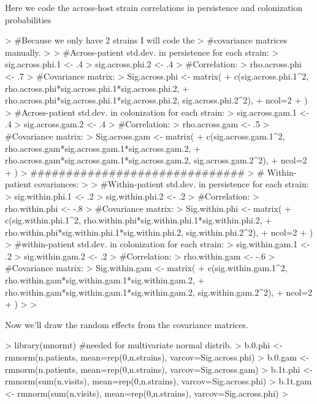 \documentclass{article}
\begin{document}
Here we code the across-host strain correlations in persistence and colonization probabilities
\begin{Schunk}
\begin{Sinput}
> #Because we only have 2 strains I will code the
> #covariance matrices manually.
> 
> #Across-patient std.dev. in persistence for each strain:
> sig.across.phi.1 <- .4
> sig.across.phi.2 <- .4
> #Correlation:
> rho.across.phi <- .7
> #Covariance matrix:
> Sig.across.phi <- matrix(
+   c(sig.across.phi.1^2, rho.across.phi*sig.across.phi.1*sig.across.phi.2,
+     rho.across.phi*sig.across.phi.1*sig.across.phi.2, sig.across.phi.2^2),
+   ncol=2
+   )
> #Across-patient std.dev. in colonization for each strain:
> sig.across.gam.1 <- .4
> sig.across.gam.2 <- .4
> #Correlation:
> rho.across.gam <- .5
> #Covariance matrix:
> Sig.across.gam <- matrix(
+   c(sig.across.gam.1^2, rho.across.gam*sig.across.gam.1*sig.across.gam.2,
+     rho.across.gam*sig.across.gam.1*sig.across.gam.2, sig.across.gam.2^2),
+   ncol=2
+   )
> ##############################
> # Within-patient covariances:
> 
> #Within-patient std.dev. in persistence for each strain:
> sig.within.phi.1 <- .2
> sig.within.phi.2 <- .2
> #Correlation:
> rho.within.phi <- -.8
> #Covariance matrix:
> Sig.within.phi <- matrix(
+   c(sig.within.phi.1^2, rho.within.phi*sig.within.phi.1*sig.within.phi.2,
+     rho.within.phi*sig.within.phi.1*sig.within.phi.2, sig.within.phi.2^2),
+   ncol=2
+   )
> #within-patient std.dev. in colonization for each strain:
> sig.within.gam.1 <- .2
> sig.within.gam.2 <- .2
> #Correlation:
> rho.within.gam <- -.6
> #Covariance matrix:
> Sig.within.gam <- matrix(
+   c(sig.within.gam.1^2, rho.within.gam*sig.within.gam.1*sig.within.gam.2,
+     rho.within.gam*sig.within.gam.1*sig.within.gam.2, sig.within.gam.2^2),
+   ncol=2
+   )
> 
> 
\end{Sinput}
\end{Schunk}

Now we'll draw the random effects from the covariance matrices.
\begin{Schunk}
\begin{Sinput}
> library(mnormt) #needed for multivariate normal distrib.
> b.0.phi <- rmnorm(n.patients, mean=rep(0,n.strains), varcov=Sig.across.phi) 
> b.0.gam <- rmnorm(n.patients, mean=rep(0,n.strains), varcov=Sig.across.gam)
> b.1t.phi <- rmnorm(sum(n.visits), mean=rep(0,n.strains), varcov=Sig.across.phi)
> b.1t.gam <- rmnorm(sum(n.visits), mean=rep(0,n.strains), varcov=Sig.across.phi)
> 
\end{Sinput}
\end{Schunk}
\end{document}
